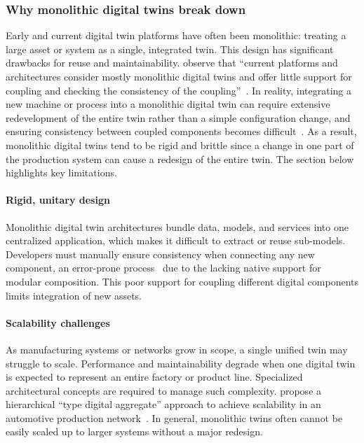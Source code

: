 \subsubsection{Why monolithic digital twins break down}
Early and current digital twin platforms have often been monolithic: treating a large asset or system as a single, integrated twin. This design has significant drawbacks for reuse and maintainability. \citeauthor{Gil2024} observe that “current platforms and architectures consider mostly monolithic digital twins and offer little support for coupling and checking the consistency of the coupling”~\cite{Gil2024}. In reality, integrating a new machine or process into a monolithic digital twin can require extensive redevelopment of the entire twin rather than a simple configuration change, and ensuring consistency between coupled components becomes difficult~\cite{Gil2024}. As a result, monolithic digital twins tend to be rigid and brittle since a change in one part of the production system can cause a redesign of the entire twin. The section below highlights key limitations.


\paragraph{Rigid, unitary design} Monolithic digital twin architectures bundle data, models, and services into one centralized application, which makes it difficult to extract or reuse sub-models. Developers must manually ensure consistency when connecting any new component, an error-prone process~\cite{Gil2024} due to the lacking native support for modular composition. This poor support for coupling different digital components limits integration of new assets.

\paragraph{Scalability challenges} As manufacturing systems or networks grow in scope, a single unified twin may struggle to scale. Performance and maintainability degrade when one digital twin is expected to represent an entire factory or product line. Specialized architectural concepts are required to manage such complexity. \citeauthor{Visser2024} propose a hierarchical “type digital aggregate” approach to achieve scalability in an automotive production network~\cite{Visser2024}. In general, monolithic twins often cannot be easily scaled up to larger systems without a major redesign.

